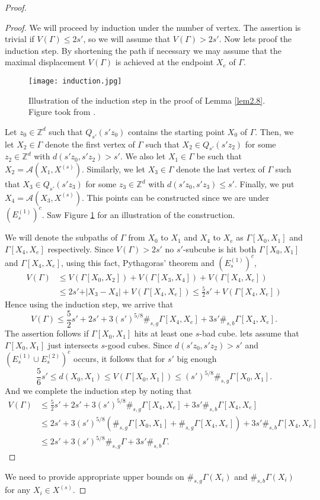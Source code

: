 \begin{proof}
\begin{proof}
We will proceed by induction under the number of vertex. The assertion is trivial if $V(\Gamma)\leq 2s'$, so we will assume that $V(\Gamma)>2s'$. Now lets proof the induction step. By shortening the path if necessary we may assume that the maximal displacement $V(\Gamma)$ is achieved at the endpoint $X_e$ of $\Gamma$.

\begin{figure}
\captionsetup{width=1\textwidth}
\centering
\texttt{[image: induction.jpg]}
\caption{Illustration of the induction step in the proof of Lemma \ref{lem2.8}. Figure took from \cite{WIAS}.}
\label{fig.2.4}
\end{figure}

Let $z_{0}\in \mathbb{Z}^d$ such that $Q_{s'}(s'z_0)$ contains the starting point $X_0$ of $\Gamma$. Then, we let $X_2\in\Gamma$ denote the first vertex of $\Gamma$ such that $X_2\in Q_{s'}(s'z_2)$ for some $z_2\in\mathbb{Z}^d$ with $d(s'z_0, s'z_2)>s'$. We also let $X_1\in\Gamma$ be such that $X_2=\mathcal{A}(X_1, X^{(s)})$. Similarly, we let $X_3\in\Gamma$ denote the last vertex of $\Gamma$ such that $X_3\in Q_{s'}(s'z_3)$ for some $z_3\in\mathbb{Z}^d$ with $d(s'z_0, s'z_3)\leq s'$. Finally, we put $X_4=\mathcal{A}(X_3, X^{(s)})$. This points can be constructed since we are under $(E_s^{(1)})^c$. Saw Figure \ref{fig.2.4} for an illustration of the construction.


We will denote the subpaths of $\Gamma$ from $X_0$ to $X_1$ and $X_4$ to $X_e$ as $\Gamma[X_0, X_1]$ and $\Gamma[X_4, X_e]$ respectively. Since $V(\Gamma)>2s'$ no $s'$-subcube is hit both $\Gamma[X_0, X_1]$ and $\Gamma[X_4, X_e]$, using this fact, Pythagoras' theorem and $(E_s^{(1)})^c$,
\begin{align}
V(\Gamma)&\leq V(\Gamma[X_0, X_2])+V(\Gamma[X_3, X_4])+V(\Gamma[X_4, X_e])\nonumber\\
&\leq 2s'+\vert X_3-X_4\vert+V(\Gamma[X_4, X_e])\leq \frac{5}{2}s'+V(\Gamma[X_4, X_e])\nonumber
\end{align}
Hence using the induction step, we arrive that
$$V(\Gamma)\leq \frac{5}{2}s'+2s'+3(s')^{5/8}\#_{s,g}\Gamma[X_4, X_e]+3s'\#_{s,b}\Gamma[X_4, X_e].$$
The assertion follows if $\Gamma[X_0, X_1]$ hits at least one $s$-bad cube. lets assume that $\Gamma[X_0, X_1]$ just intersects $s$-good cubes. Since $d(s'z_0, s'z_2)>s'$ and  $(E_s^{(1)}\cup E_s^{(2)})^c$ occurs, it follows that for $s'$ big enough $$\frac{5}{6}s'\leq d(X_0, X_1)\leq V(\Gamma [X_0, X_1])\leq (s')^{5/8}\#_{s,g}\Gamma[X_0, X_1]. $$
And we complete the induction step by noting that
\begin{align}
V(\Gamma)&\leq \frac{5}{2}s'+2s'+3(s')^{5/8}\#_{s,g}\Gamma[X_4, X_e]+3s'\#_{s,b}\Gamma[X_4, X_e]\nonumber\\
&\leq 2s'+3(s')^{5/8}(\#_{s,g}\Gamma[X_0, X_1]+\#_{s,g}\Gamma[X_4, X_e])+3s'\#_{s,b}\Gamma[X_4, X_e]\nonumber\\
&\leq 2s'+3(s')^{5/8}\#_{s,g}\Gamma+3s'\#_{s,b}\Gamma\nonumber.
\end{align}
\end{proof}
We need to provide appropriate upper bounds on $\#_{s,g}\Gamma(X_i)$ and $\#_{s,b}\Gamma(X_i)$ for any $X_i\in X^{(s)}$.


\end{proof}
